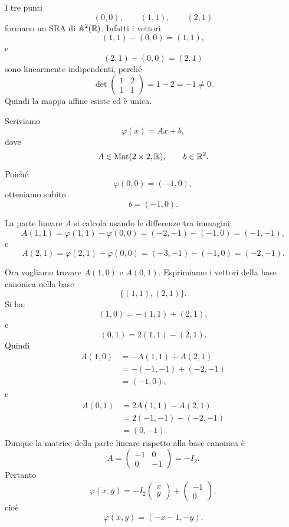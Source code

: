 \documentclass[a4paper]{article}
\begin{document}
\begin{snippetsolution}{}
    I tre punti
    \[
        (0,0),
        \qquad
        (1,1),
        \qquad
        (2,1)
    \]
    formano un SRA di \(\mathbb{A}^2(\mathbb{R})\). Infatti i vettori
    \[
        (1,1)-(0,0)=(1,1),
    \]
    e
    \[
        (2,1)-(0,0)=(2,1)
    \]
    sono linearmente indipendenti, perché
    \[
        \det
        \begin{pmatrix}
            1 & 2\\
            1 & 1
        \end{pmatrix}
        =
        1-2=-1\neq 0.
    \]
    Quindi la mappa affine esiste ed è unica.

    Scriviamo
    \[
        \varphi(x)=Ax+b,
    \]
    dove
    \[
        A\in\operatorname{Mat}(2\times 2,\mathbb{R}),
        \qquad
        b\in\mathbb{R}^2.
    \]
    Poiché
    \[
        \varphi(0,0)=(-1,0),
    \]
    otteniamo subito
    \[
        b=(-1,0).
    \]

    La parte lineare \(A\) si calcola usando le differenze tra immagini:
    \[
        A(1,1)
        =
        \varphi(1,1)-\varphi(0,0)
        =
        (-2,-1)-(-1,0)
        =
        (-1,-1),
    \]
    e
    \[
        A(2,1)
        =
        \varphi(2,1)-\varphi(0,0)
        =
        (-3,-1)-(-1,0)
        =
        (-2,-1).
    \]

    Ora vogliamo trovare \(A(1,0)\) e \(A(0,1)\). Esprimiamo i vettori della base canonica nella base
    \[
        \{(1,1),(2,1)\}.
    \]
    Si ha:
    \[
        (1,0)=-(1,1)+(2,1),
    \]
    e
    \[
        (0,1)=2(1,1)-(2,1).
    \]
    Quindi
    \begin{align*}
        A(1,0)
        &=
        -A(1,1)+A(2,1)\\
        &=
        -(-1,-1)+(-2,-1)\\
        &=
        (-1,0),
    \end{align*}
    e
    \begin{align*}
        A(0,1)
        &=
        2A(1,1)-A(2,1)\\
        &=
        2(-1,-1)-(-2,-1)\\
        &=
        (0,-1).
    \end{align*}
    Dunque la matrice della parte lineare rispetto alla base canonica è
    \[
        A=
        \begin{pmatrix}
            -1 & 0\\
            0 & -1
        \end{pmatrix}
        =
        -I_2.
    \]
    Pertanto
    \[
        \varphi(x,y)
        =
        -I_2
        \begin{pmatrix}
            x\\
            y
        \end{pmatrix}
        +
        \begin{pmatrix}
            -1\\
            0
        \end{pmatrix},
    \]
    cioè
    \[
        \varphi(x,y)=(-x-1,-y).
    \]


\end{snippetsolution}
\end{document}
